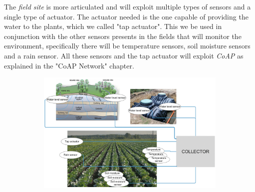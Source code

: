 The \textit{field site} is more articulated and will exploit multiple types of sensors and a single type of actuator. The actuator needed is the one capable of providing the water to the plants, which we called "tap actuator". This we be used in conjunction with the other sensors presents in the fields that will monitor the environment, specifically there will be temperature sensors, soil moisture sensors and a rain sensor. 
All these sensors and the tap actuator will exploit \textit{CoAP} as explained in the "CoAP Network" chapter.


\begin{figure}[H]
	\begin{subfigure}{\textwidth}
	\centering
		\includegraphics[width=0.66\linewidth]{img/deployment.png} 
	\end{subfigure}
\end{figure}